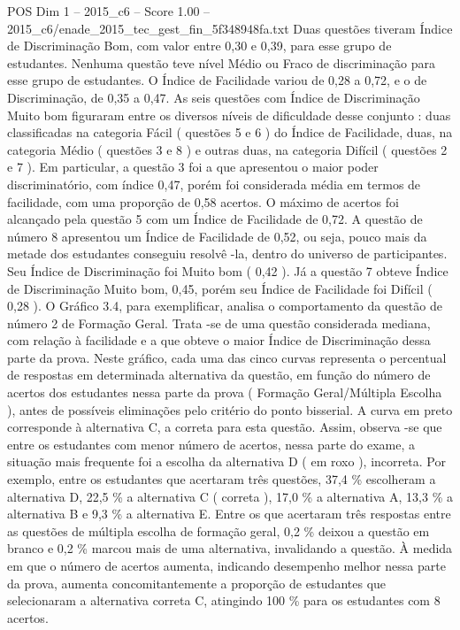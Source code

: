 \begin{textsample}{POS Dim 1 – 2015\_c6 – Score 1.00 – 2015\_c6/enade\_2015\_tec\_gest\_fin\_5f348948fa.txt}
Duas questões tiveram Índice de Discriminação Bom, com valor entre 0,30 e 0,39, para esse grupo de estudantes.
Nenhuma questão teve nível Médio ou Fraco de discriminação para esse grupo de estudantes.
O Índice de Facilidade variou de 0,28 a 0,72, e o de Discriminação, de 0,35 a 0,47.
As seis questões com Índice de Discriminação Muito bom figuraram entre os diversos níveis de dificuldade desse conjunto : duas classificadas na categoria Fácil ( questões 5 e 6 ) do Índice de Facilidade, duas, na categoria Médio ( questões 3 e 8 ) e outras duas, na categoria Difícil ( questões 2 e 7 ).
Em particular, a questão 3 foi a que apresentou o maior poder discriminatório, com índice 0,47, porém foi considerada média em termos de facilidade, com uma proporção de 0,58 acertos.
O máximo de acertos foi alcançado pela questão 5 com um Índice de Facilidade de 0,72.
A questão de número 8 apresentou um Índice de Facilidade de 0,52, ou seja, pouco mais da metade dos estudantes conseguiu resolvê -la, dentro do universo de participantes.
Seu Índice de Discriminação foi Muito bom ( 0,42 ).
Já a questão 7 obteve Índice de Discriminação Muito bom, 0,45, porém seu Índice de Facilidade foi Difícil ( 0,28 ).
O Gráfico 3.4, para exemplificar, analisa o comportamento da questão de número 2 de Formação Geral.
Trata -se de uma questão considerada mediana, com relação à facilidade e a que obteve o maior Índice de Discriminação dessa parte da prova.
Neste gráfico, cada uma das cinco curvas representa o percentual de respostas em determinada alternativa da questão, em função do número de acertos dos estudantes nessa parte da prova ( Formação Geral/Múltipla Escolha ), antes de possíveis eliminações pelo critério do ponto bisserial.
A curva em preto corresponde à alternativa C, a correta para esta questão.
Assim, observa -se que entre os estudantes com menor número de acertos, nessa parte do exame, a situação mais frequente foi a escolha da alternativa D ( em roxo ), incorreta.
Por exemplo, entre os estudantes que acertaram três questões, 37,4 \% escolheram a alternativa D, 22,5 \% a alternativa C ( correta ), 17,0 \% a alternativa A, 13,3 \% a alternativa B e 9,3 \% a alternativa E.
Entre os que acertaram três respostas entre as questões de múltipla escolha de formação geral, 0,2 \% deixou a questão em branco e 0,2 \% marcou mais de uma alternativa, invalidando a questão.
À medida em que o número de acertos aumenta, indicando desempenho melhor nessa parte da prova, aumenta concomitantemente a proporção de estudantes que selecionaram a alternativa correta C, atingindo 100 \% para os estudantes com 8 acertos.

\end{textsample}
